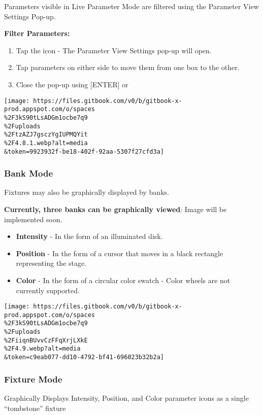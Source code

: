 \documentclass[
]{article}
\begin{document}
Parameters visible in Live Parameter Mode are filtered using the Parameter View Settings Pop-up.

\textbf{Filter Parameters:}

\begin{enumerate}
\def\labelenumi{\arabic{enumi}.}
\item
  Tap the \href{image.png}{} icon - The Parameter View Settings pop-up will open.
\item
  Tap parameters on either side to move them from one box to the other.
\item
  Close the pop-up using {[}ENTER{]} or \href{image.png}{}
\end{enumerate}

\texttt{[image: https://files.gitbook.com/v0/b/gitbook-x-prod.appspot.com/o/spaces\\\%2F3kS90tLsADGm1ocbe7q9\\\%2Fuploads\\\%2FtzAZJ7gsczYgIUPMQYit\\\%2F4.8.1.webp?alt=media\\\&token=9923932f-be18-402f-92aa-5307f27cfd3a]}

\hypertarget{bank-mode}{%
\subsubsection{Bank Mode}\label{bank-mode}}

Fixtures may also be graphically displayed by banks.

\textbf{Currently, three banks can be graphically viewed}: {Image will be implemented soon.}

\begin{itemize}
\item
  \textbf{Intensity} - In the form of an illuminated disk.
\item
  \textbf{Position} - In the form of a cursor that moves in a black rectangle representing the stage.
\item
  \textbf{Color} - In the form of a circular color swatch - Color wheels are not currently supported.
\end{itemize}

\texttt{[image: https://files.gitbook.com/v0/b/gitbook-x-prod.appspot.com/o/spaces\\\%2F3kS90tLsADGm1ocbe7q9\\\%2Fuploads\\\%2FiiqnBUvvCzFFqXrjLXkE\\\%2F4.9.webp?alt=media\\\&token=c9eab077-dd10-4792-bf41-696023b32b2a]}

\hypertarget{fixture-mode}{%
\subsubsection{Fixture Mode}\label{fixture-mode}}

Graphically Displays Intensity, Position, and Color parameter icons as a single ``tombstone'' fixture
\end{document}
